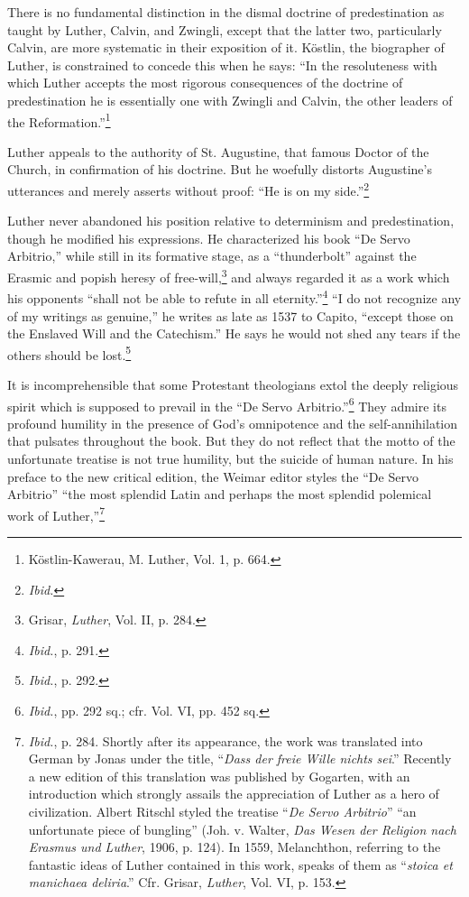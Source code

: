 There is no fundamental distinction in the dismal doctrine of
predestination as taught by Luther, Calvin, and Zwingli, except
that the latter two, particularly Calvin, are more systematic in their
exposition of it. Köstlin, the biographer of Luther, is constrained
to concede this when he says: “In the resoluteness with which Luther
accepts the most rigorous consequences of the doctrine of predestination
he is essentially one with Zwingli and Calvin, the other leaders
of the Reformation.”\footnote{Köstlin-Kawerau, M. Luther, Vol. 1, p. 664.}

Luther appeals to the authority of St. Augustine, that famous
Doctor of the Church, in confirmation of his doctrine. But he
woefully distorts Augustine’s utterances and merely asserts without
proof: “He is on my side.”\footnote{\textit{Ibid.}}

Luther never abandoned his position relative to determinism and
predestination, though he modified his expressions. He characterized
his book “De Servo Arbitrio,” while still in its formative stage, as
a “thunderbolt” against the Erasmic and popish heresy of free-will,\footnote
{Grisar, \textit{Luther}, Vol. II, p. 284.}
and always regarded it as a work which his opponents “shall
not be able to refute in all eternity.”\footnote{\textit{Ibid.}, p. 291.}
“I do not recognize any
of my writings as genuine,'' he writes as late as 1537 to Capito,
``except those on the Enslaved Will and the Catechism.'' He says
he would not shed any tears if the others should be lost.\footnote{\textit{Ibid.}, p. 292.}

It is incomprehensible that some Protestant theologians extol the
deeply religious spirit which is supposed to prevail in the “De Servo
Arbitrio.”\footnote
{\textit{Ibid.}, pp. 292 sq.; cfr. Vol. VI, pp. 452 sq.}
They admire its profound humility in the presence
of God’s omnipotence and the self-annihilation that pulsates
throughout the book. But they do not reflect that the motto of the
unfortunate treatise is not true humility, but the suicide of human
nature. In his preface to the new critical edition, the Weimar editor
styles the “De Servo Arbitrio” “the most splendid Latin and perhaps
the most splendid polemical work of Luther,”\footnote
{\textit{Ibid.}, p. 284. Shortly after its appearance, the work was translated into German by
Jonas under the title, “\textit{Dass der freie Wille nichts sei}.” Recently a new edition of
this translation was published by Gogarten, with an introduction which strongly assails
the appreciation of Luther as a hero of civilization. Albert Ritschl styled the treatise ``\textit{De Servo
Arbitrio}'' “an unfortunate piece of bungling” (Joh. v. Walter, \textit{Das Wesen der Religion
nach Erasmus und Luther}, 1906, p. 124). In 1559, Melanchthon, referring to the fantastic
ideas of Luther contained in this work, speaks of them as “\textit{stoica et manichaea
deliria}.” Cfr. Grisar, \textit{Luther}, Vol. VI, p. 153.}

